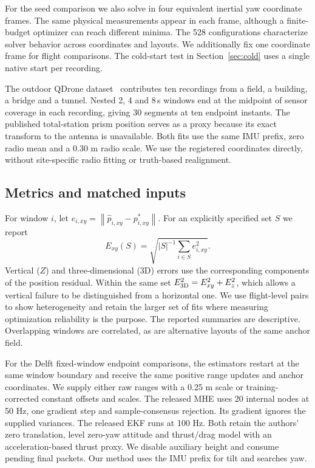 \documentclass{IEEEtaes}
\newcommand{\norm}[1]{\left\lVert#1\right\rVert}
\begin{document}
For the seed comparison we also solve in four equivalent inertial yaw coordinate frames. The same physical measurements appear in each frame, although a finite-budget optimizer can reach different minima. The 528 configurations characterize solver behavior across coordinates and layouts. We additionally fix one coordinate frame for flight comparisons. The cold-start test in Section~\ref{sec:cold} uses a single native start per recording.

The outdoor QDrone dataset~\cite{qdrone} contributes ten recordings from a field, a building, a bridge and a tunnel. Nested 2, 4 and 8\,s windows end at the midpoint of sensor coverage in each recording, giving 30 segments at ten endpoint instants. The published total-station prism position serves as a proxy because its exact transform to the antenna is unavailable. Both fits use the same IMU prefix, zero radio mean and a \(0.30\) m radio scale. We use the registered coordinates directly, without site-specific radio fitting or truth-based realignment.

\subsection{Metrics and matched inputs}
For window \(i\), let \(e_{i,xy}=\norm{\hat p_{i,xy}-p^*_{i,xy}}\). For an explicitly specified set \(S\) we report
\begin{equation}
 E_{xy}(S)=\sqrt{|S|^{-1}\sum_{i\in S}e_{i,xy}^2}. \label{eq:score}
\end{equation}
Vertical (\(Z\)) and three-dimensional (3D) errors use the corresponding components of the position residual. Within the same set \(E_{\rm 3D}^2=E_{xy}^2+E_z^2\), which allows a vertical failure to be distinguished from a horizontal one. We use flight-level pairs to show heterogeneity and retain the larger set of fits where measuring optimization reliability is the purpose. The reported summaries are descriptive. Overlapping windows are correlated, as are alternative layouts of the same anchor field.

For the Delft fixed-window endpoint comparisons, the estimators restart at the same window boundary and receive the same positive range updates and anchor coordinates. We supply either raw ranges with a 0.25 m scale or training-corrected constant offsets and scales. The released MHE uses 20 internal nodes at 50 Hz, one gradient step and sample-consensus rejection. Its gradient ignores the supplied variances. The released EKF runs at 100 Hz. Both retain the authors' zero translation, level zero-yaw attitude and thrust/drag model with an acceleration-based thrust proxy. We disable auxiliary height and consume pending final packets. Our method uses the IMU prefix for tilt and searches yaw.
\end{document}
